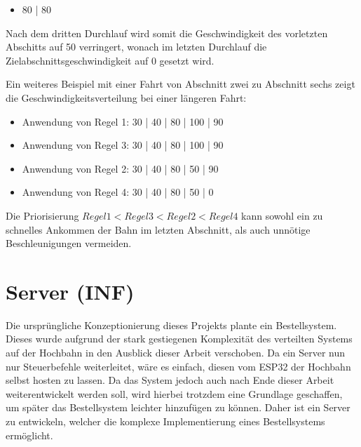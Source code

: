 \begin{center}
	\begin{itemize}
		\item 80 | 80
	\end{itemize}
\end{center}

Nach dem dritten Durchlauf wird somit die Geschwindigkeit des vorletzten Abschitts auf 50 verringert, wonach im letzten Durchlauf die Zielabschnittsgeschwindigkeit auf 0 gesetzt wird. 

Ein weiteres Beispiel mit einer Fahrt von Abschnitt zwei zu Abschnitt sechs zeigt die Geschwindigkeitsverteilung bei einer längeren Fahrt:

\begin{center}
	\begin{itemize}
		\item Anwendung von Regel 1: 30 | 40 | 80 | 100 | 90 
		\item Anwendung von Regel 3: 30 | 40 | 80 | 100 | 90 
		\item Anwendung von Regel 2: 30 | 40 | 80 |  50 | 90 
		\item Anwendung von Regel 4: 30 | 40 | 80 |  50 |  0 
	\end{itemize}
\end{center}

Die Priorisierung $Regel1 <  Regel3 <  Regel2  < Regel4$ kann  sowohl ein zu schnelles Ankommen der Bahn im letzten Abschnitt, als auch unnötige Beschleunigungen vermeiden.

\chapter{Server (INF)}
Die ursprüngliche Konzeptionierung dieses Projekts plante ein Bestellsystem. Dieses wurde aufgrund der stark gestiegenen Komplexität des verteilten Systems auf der Hochbahn in den Ausblick dieser Arbeit verschoben. Da ein Server nun nur Steuerbefehle weiterleitet, wäre es einfach, diesen vom ESP32 der Hochbahn selbst hosten zu lassen. Da das System jedoch auch nach Ende dieser Arbeit weiterentwickelt werden soll, wird hierbei trotzdem eine Grundlage geschaffen, um später das Bestellsystem leichter hinzufügen zu können. Daher ist ein Server zu entwickeln, welcher die komplexe Implementierung eines Bestellsystems ermöglicht. 
